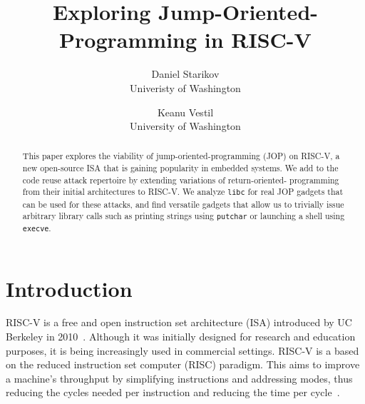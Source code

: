 \title{\Large \bf Exploring Jump-Oriented-Programming in RISC-V}

\author{
{\rm Daniel Starikov}\\
Univeristy of Washington
\and
{\rm Keanu Vestil}\\
University of Washington
} %

\maketitle

\begin{abstract}
This paper explores the viability of jump-oriented-programming (JOP) on RISC-V,
a new open-source ISA that is gaining popularity in embedded systems. We add to
the code reuse attack repertoire by extending variations of return-oriented-%
programming from their initial architectures to RISC-V. We analyze \verb|libc|
for real JOP gadgets that can be used for these attacks, and find versatile
gadgets that allow us to trivially issue arbitrary library calls such as
printing strings using \verb|putchar| or launching a shell using \verb|execve|.
\end{abstract}


\section{Introduction}

RISC-V is a free and open instruction set architecture (ISA) introduced by UC
Berkeley in 2010~\cite{riscvmanual}. Although it was initially designed for research and education
purposes, it is being increasingly used in commercial settings. RISC-V is a
based on the reduced instruction set computer (RISC) paradigm. This aims to
improve a machine's throughput by simplifying instructions and addressing modes,
thus reducing the cycles needed per instruction and reducing the time per cycle~\cite{patterson98risc}.

